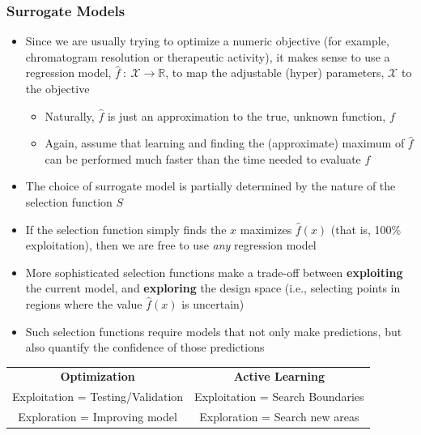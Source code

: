 \documentclass[10pt]{article}
\begin{document}
\subsubsection*{Surrogate Models}
\begin{itemize}
	\item Since we are usually trying to optimize a numeric objective (for example, chromatogram resolution or therapeutic activity), it makes sense to use a regression model, $\hat{f}\::\: \mathcal{X} \rightarrow \mathbb{R}$, to map the adjustable (hyper) parameters, $\mathcal{X}$ to the objective
	\begin{itemize}
	    \item Naturally, $\hat{f}$ is just an approximation to the true, unknown function, $f$
	    \item Again, assume that learning and finding the (approximate) maximum of $\hat{f}$ can be performed much faster than the time needed to evaluate $f$
    \end{itemize}
    \item The choice of surrogate model is partially determined by the nature of the selection function $S$
    \item If the selection function simply finds the $x$ maximizes $\hat{f}(x)$ (that is, 100\% exploitation), then we are free to use \textit{any} regression model
    \item More sophisticated selection functions make a trade-off between \textbf{exploiting} the current model, and \textbf{exploring} the design space (i.e., selecting points in regions where the value $\hat{f}(x)$ is uncertain)
    \item Such selection functions require models that not only make predictions, but also quantify the confidence of those predictions
\end{itemize}
\begin{center}
    \begin{tabular}{cc}
        \textbf{Optimization} & \textbf{Active Learning} \\
        Exploitation = Testing/Validation & Exploitation = Search Boundaries \\
        Exploration = Improving model & Exploration = Search new areas
    \end{tabular}
\end{center}
\end{document}

